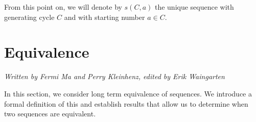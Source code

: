 \documentclass[runningheads,a4paper]{llncs}
\begin{document}
%
%
%
%
%
%

From this point on, we will denote by $s(C,a)$ the unique sequence with generating cycle $C$ and with starting number $a \in C$.

\section{Equivalence}
\label{equivalence}
\emph{Written by Fermi Ma and Perry Kleinhenz, edited by Erik Waingarten}

In this section, we consider long term equivalence of sequences. We introduce a formal definition of this and establish results that allow us to determine when two sequences are equivalent.  
\end{document}
